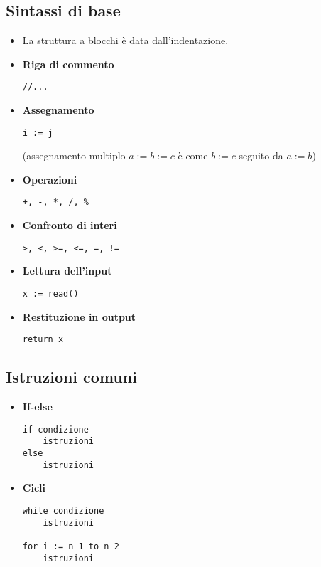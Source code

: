 \subsection{Sintassi di base}

\begin{itemize}
    \item La struttura a blocchi è data dall'indentazione.
    \item \textbf{Riga di commento}
    \begin{lstlisting}
//...
    \end{lstlisting}
    \item \textbf{Assegnamento}
    \begin{lstlisting}
i := j
    \end{lstlisting}
    (assegnamento multiplo \( a := b := c \) è come \( b := c \) seguito da \( a := b \))
    \item \textbf{Operazioni}
    \begin{lstlisting}
+, -, *, /, %
    \end{lstlisting}
    \item \textbf{Confronto di interi}
    \begin{lstlisting}
>, <, >=, <=, =, !=
    \end{lstlisting}
    \item \textbf{Lettura dell'input}
    \begin{lstlisting}
x := read()
    \end{lstlisting}
    \item \textbf{Restituzione in output}
    \begin{lstlisting}
return x
    \end{lstlisting}
\end{itemize}

\subsection{Istruzioni comuni}

\begin{itemize}
    \item \textbf{If-else}
    \begin{lstlisting}
if condizione
    istruzioni
else
    istruzioni
    \end{lstlisting}
    \item \textbf{Cicli}
    \begin{lstlisting}
while condizione
    istruzioni

for i := n_1 to n_2
    istruzioni
    \end{lstlisting}
\end{itemize}

